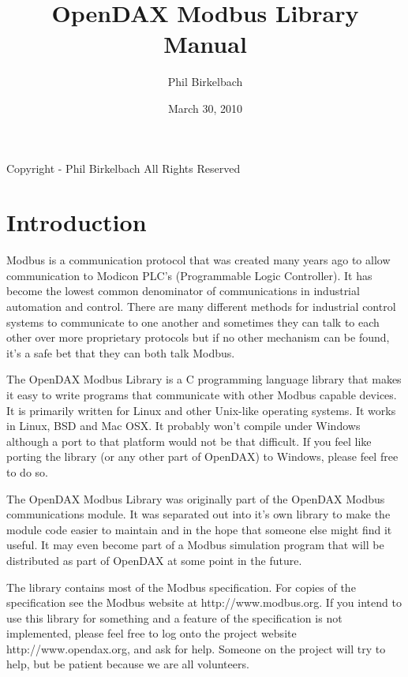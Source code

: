 

\title{OpenDAX Modbus Library Manual}
\date{March 30, 2010}
\author{Phil Birkelbach}



\maketitle

\begin{flushleft}
Copyright  - Phil Birkelbach\linebreak
All Rights Reserved
\end{flushleft}

\tableofcontents
\newpage

\chapter{Introduction}
Modbus is a communication protocol that was created many years ago to allow communication to Modicon PLC's (Programmable Logic Controller).  It has become the lowest common denominator of communications in industrial automation and control.  There are many different methods for industrial control systems to communicate to one another and sometimes they can talk to each other over more proprietary protocols but if no other mechanism can be found, it's a safe bet that they can both talk Modbus.

The OpenDAX Modbus Library is a C programming language library that makes it easy to write programs that communicate with other Modbus capable devices.  It is primarily written for Linux and other Unix-like operating systems.  It works in Linux, BSD and Mac OSX.  It probably won't compile under Windows although a port to that platform would not be that difficult.  If you feel like porting the library (or any other part of OpenDAX) to Windows, please feel free to do so.

The OpenDAX Modbus Library was originally part of the OpenDAX Modbus communications module.  It was separated out into it's own library to make the module code easier to maintain and in the hope that someone else might find it useful.  It may even become part of a Modbus simulation program that will be distributed as part of OpenDAX at some point in the future.

The library contains most of the Modbus specification.  For copies of the specification see the Modbus website at http://www.modbus.org.  If you intend to use this library for something and a feature of the specification is not implemented, please feel free to log onto the project website http://www.opendax.org, and ask for help.  Someone on the project will try to help, but be patient because we are all volunteers.

